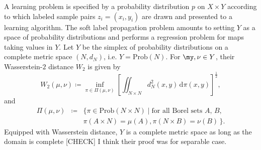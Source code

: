 \documentclass[letterpaper]{article} %
\begin{document}
A learning problem is specified by a probability distribution $p$ on $X\times Y$ according to which labeled sample pairs $z_i=\left( x_i,y_i \right)$ are drawn and presented to a learning algorithm. The soft label propagation problem amounts to setting $Y$ as a space of probability distributions and performs a regression problem for maps taking values in $Y$. Let 
$Y$ be the simplex of probability distributions on a complete metric space $\left( N,d_N \right)$, i.e. $Y=\mathrm{Prob}\left( N \right)$. For $\my, \nu\in Y$, their Wasserstein-$2$ distance $W_2$ is given by 
\begin{equation}
  \label{eq:wasserstein-distance}
  W_2 \left( \mu,\nu \right)\coloneqq\inf_{\pi\in\Pi \left( \mu,\nu \right)}\left[\iint_{N\times N}d^2_N \left( x,y \right)\,\mathrm{d}\pi \left( x,y \right)\right]^{\frac{1}{2}},
\end{equation}
and
\begin{eqnarray}
  \Pi \left( \mu,\nu \right)&\coloneqq &\big\{ \pi\in \mathrm{Prob}\left( N\times N \right) \mid \textrm{for all Borel sets $A$, $B$}, \nonumber\\
  &&\pi \left( A\times N \right)=\mu \left( A \right),\pi \left( N\times B \right)=\nu \left( B \right)\,\big\}. \label{eq:coupling}
\end{eqnarray}
Equipped with Wasserstein distance, $Y$ is a complete metric space as long as the domain is complete \cite[Theorem 6.18]{villani2003topics} {\color{blue}[CHECK] I think their proof was for separable case}. 
\end{document}
